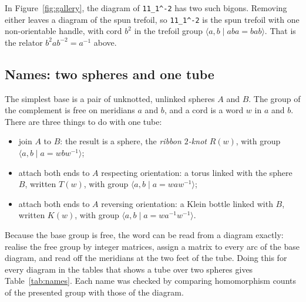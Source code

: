 \documentclass[11pt]{amsart}
\newcommand{\lab}[1]{\texttt{#1}}
\newcommand{\inv}{^{-1}}
\theoremstyle{plain}
\theoremstyle{remark}
\begin{document}
In Figure~\ref{fig:gallery}, the diagram of \lab{11\_1\^{}-2} has two such bigons. Removing either leaves
a diagram of the spun trefoil, so \lab{11\_1\^{}-2} is the spun trefoil with one non-orientable handle,
with cord $b^2$ in the trefoil group $\langle a,b\mid aba=bab\rangle$. That is the relator
$b^2ab^{-2}=a\inv$ above.

\subsection{Names: two spheres and one tube}\label{sec:names}

The simplest base is a pair of unknotted, unlinked spheres $A$ and $B$. The group of the complement is
free on meridians $a$ and $b$, and a cord is a word $w$ in $a$ and $b$. There are three things to do with
one tube:

\begin{itemize}[leftmargin=*]
\item join $A$ to $B$: the result is a sphere, the \emph{ribbon $2$-knot} $R(w)$, with group
$\langle a,b\mid a=wbw\inv\rangle$;
\item attach both ends to $A$ respecting orientation: a torus linked with the sphere $B$, written $T(w)$,
with group $\langle a,b\mid a=waw\inv\rangle$;
\item attach both ends to $A$ reversing orientation: a Klein bottle linked with $B$, written $K(w)$, with
group $\langle a,b\mid a=wa\inv w\inv\rangle$.
\end{itemize}

Because the base group is free, the word can be read from a diagram exactly: realise the free group by
integer matrices, assign a matrix to every arc of the base diagram, and read off the meridians at the two
feet of the tube. Doing this for every diagram in the tables that shows a tube over two spheres gives
Table~\ref{tab:names}. Each name was checked by comparing homomorphism counts of the presented group with
those of the diagram.
\end{document}
